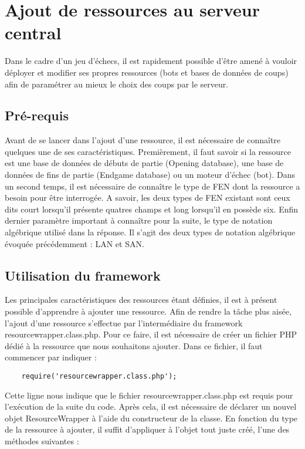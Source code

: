 \documentclass[a4paper,11pt]{article}
\begin{document}
\section{Ajout de ressources au serveur central}
Dans le cadre d'un jeu d'échecs, il est rapidement possible d'être amené à vouloir déployer et modifier ses propres ressources (bots et bases de données de coups) afin de paramétrer au mieux le choix des coups par le serveur.
        

\subsection{Pré-requis}
Avant de se lancer dans l'ajout d'une ressource, il est nécessaire de connaître quelques une de ses caractéristiques.
Premièrement, il faut savoir si la ressource est une base de données de débuts de partie (Opening database), une base de données de fins de partie (Endgame database) ou un moteur d'échec (bot).
Dans un second temps, il est nécessaire de connaître le type de FEN dont la ressource a besoin pour être interrogée.
A savoir, les deux types de FEN existant sont ceux dits court lorsqu'il présente quatres champs et long lorsqu'il en possède six.
Enfin dernier paramètre important à connaître pour la suite, le type de notation algébrique utilisé dans la réponse.
Il s'agit des deux types de notation algébrique évoquée précédemment : LAN et SAN.
	
     
\subsection{Utilisation du framework}
Les principales caractéristiques des ressources étant définies, il est à présent possible d'apprendre à ajouter une ressource.
Afin de rendre la tâche plus aisée, l'ajout d'une ressource s'effectue par l'intermédiaire du framework resourcewrapper.class.php.
Pour ce faire, il est nécessaire de créer un fichier PHP dédié à la ressource que nous souhaitons ajouter.
Dans ce fichier, il faut commencer par indiquer : 
	\begin{lstlisting}
	require('resourcewrapper.class.php');
	\end{lstlisting} 
	Cette ligne nous indique que le fichier resourcewrapper.class.php est requis pour l'exécution de la suite du code. Après cela, il est nécessaire de déclarer un nouvel objet ResourceWrapper à l'aide du constructeur de la classe. En fonction du type de la ressource à ajouter, il suffit d'appliquer à l'objet tout juste créé, l'une des méthodes suivantes :
\end{document}
